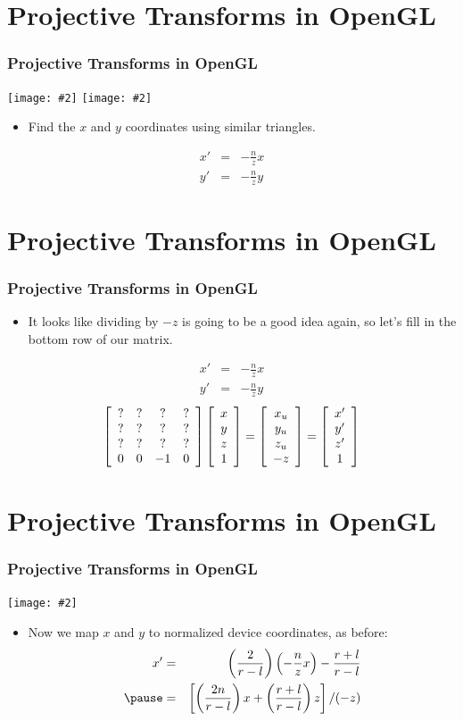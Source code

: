 \documentclass[slidestop,xcolor=pst]{beamer}
\newcommand{\graphc}[2]{\centerline{\texttt{[image: \#2]}}}
\newcommand{\graph}[2]{{\texttt{[image: \#2]}}}
\newcommand{\sect}[1]{
\section{#1}
\begin{frame}[fragile]\frametitle{#1}
}
\begin{document}
\sect{Projective Transforms in OpenGL}
\graph{.49}{gl_projectionmatrix03.png}\hfill
\graph{.49}{gl_projectionmatrix04.png}
\begin{itemize}
\item Find the $x$ and $y$ coordinates using similar triangles.
\end{itemize}
\begin{eqnarray*}
x' &=& -\frac{n}{z}x\\
y' &=& -\frac{n}{z}y
\end{eqnarray*}
\end{frame}

\sect{Projective Transforms in OpenGL}
\begin{itemize}
\item It looks like dividing by $-z$ is going to be a good idea again,
  so let's fill in the bottom row of our matrix.
\end{itemize}
\begin{eqnarray*}
x' &=& -\frac{n}{z}x\\
y' &=& -\frac{n}{z}y
\end{eqnarray*}\pause
\[\left[\begin{array}{cccc} ?&?&?&? \\ ?&?&?&? \\ ?&?&?&? \\ 0&0&-1&0\end{array}\right]\left[\begin{array}{c} x\\y\\z \\ 1\end{array}\right]
=\left[\begin{array}{c} x_u\\y_u\\z_u\\-z \end{array}\right]
=\left[\begin{array}{c} x'\\y'\\z' \\ 1\end{array}\right]
\]
\end{frame}

\sect{Projective Transforms in OpenGL}
\graphc{.8}{gl_projectionmatrix01.png}
\begin{itemize}
\item Now we map $x$ and $y$ to normalized device coordinates, as
  before: 
\begin{eqnarray*}
 x' &=& \left(\frac{2}{r-l}\right)\left(-\frac{n}{z}x\right)-\frac{r+l}{r-l}\\
\pause
 &=& \left[\left(\frac{2n}{r-l}\right)x + \left(\frac{r+l}{r-l}\right)z\right]/(-z)
\end{eqnarray*}
\end{itemize}
\end{frame}
\end{document}
